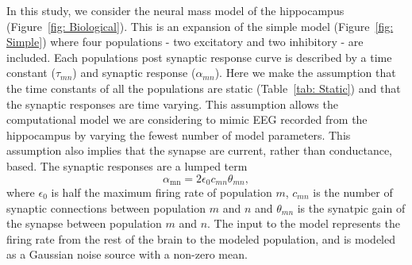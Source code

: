 In this study, we consider the neural mass model of the hippocampus (Figure~\ref{fig: Biological}). This is an expansion of the simple model (Figure~\ref{fig: Simple}) where four populations - two excitatory and two inhibitory - are included. Each populations post synaptic response curve is described by a time constant ($\tau_{mn}$) and synaptic response ($\alpha_{mn}$). Here we make the assumption that the time constants of all the populations are static (Table~\ref{tab: Static}) and that the synaptic responses are time varying. This assumption allows the computational model we are considering to mimic EEG recorded from the hippocampus by varying the fewest number of model parameters. This assumption also implies that the synapse are current, rather than conductance, based. The synaptic responses are a lumped term
\begin{equation}\label{eq: Synaptoic response}
    \alpha_{\mathrm{mn}} = 2\epsilon_{0}c_{mn}\theta_{mn},
\end{equation} where $\epsilon_0$ is half the maximum firing rate of population $m$, $c_{mn}$ is the number of synaptic connections between population $m$ and $n$ and $\theta_{mn}$ is the synatpic gain of the synapse between population $m$ and $n$. The input to the model represents the firing rate from the rest of the brain to the modeled population, and is modeled as a Gaussian noise source with a non-zero mean.

